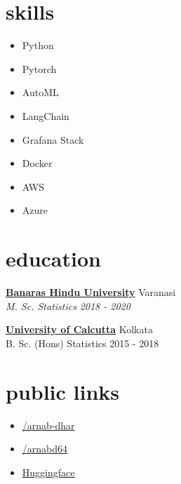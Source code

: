 \documentclass[12pt]{article}
\newcommand{\entry}[4]{{{\textbf{#1}}} \hfill #3 \\ #2 \hfill #4}
\begin{document}
\begin{paracol}{2}

\switchcolumn

\section{skills}
\begin{itemize}[itemsep=1pt,label={\faCode}]
  \item Python
  \item Pytorch
  \item AutoML
  \item LangChain
  \item Grafana Stack
  \item Docker
  \item AWS
  \item Azure
\end{itemize}


\switchcolumn
\section{education}

\entry{\href{https://www.bhu.ac.in/Site/Home/1_2_16_Main-Site}{Banaras Hindu University}}{\emph{M. Sc. Statistics}}{Varanasi}{\emph{2018 - 2020}}

\medskip

\entry{\href{https://caluniv.ac.in/}{University of Calcutta}}{B. Sc. (Hons) Statistics}{Kolkata}{2015 - 2018}

\switchcolumn
\section{public links}

\begin{itemize}[itemsep=1pt]
  \item[\faLinkedin] \href{https://www.linkedin.com/in/arnab-dhar}{/arnab-dhar}
  \item[\faGithub] \href{https://www.github.com/arnabd64}{/arnabd64} 
  \item[\faLink] \href{https://hf.co/arnabdhar}{Huggingface} 
\end{itemize}


\end{paracol}
\end{document}
